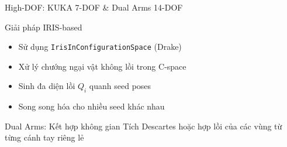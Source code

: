 \documentclass[aspectratio=169]{beamer}
\begin{document}
\begin{frame}{High-DOF: KUKA 7-DOF \& Dual Arms 14-DOF}


    \begin{block}{Giải pháp IRIS-based}
        \begin{itemize}
            \item Sử dụng \texttt{IrisInConfigurationSpace} (Drake)
            \item Xử lý chướng ngại vật không lồi trong C-space
            \item Sinh đa diện lồi $Q_i$ quanh seed poses
            \item Song song hóa cho nhiều seed khác nhau
        \end{itemize}
    \end{block}

    \begin{exampleblock}{Dual Arms: Kết hợp không gian}
        Tích Descartes hoặc hợp lồi của các vùng từ từng cánh tay riêng lẻ
    \end{exampleblock}

\end{frame}
\end{document}
